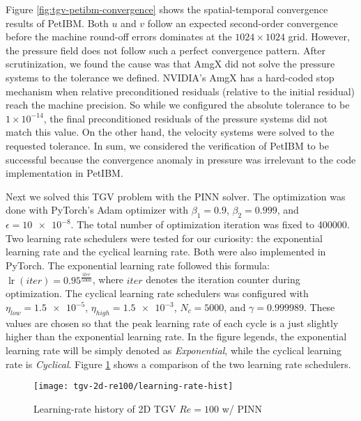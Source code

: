 Figure \ref{fig:tgv-petibm-convergence} shows the spatial-temporal convergence results of PetIBM.
Both $u$ and $v$ follow an expected second-order convergence before the machine round-off errors dominates at the $1024 \times 1024$ grid.
However, the pressure field does not follow such a perfect convergence pattern.
After scrutinization, we found the cause was that AmgX did not solve the pressure systems to the tolerance we defined.
NVIDIA's AmgX has a hard-coded stop mechanism when relative preconditioned residuals (relative to the initial residual) reach the machine precision.
So while we configured the absolute tolerance to be $1\times 10^{-14}$, the final preconditioned residuals of the pressure systems did not match this value.
On the other hand, the velocity systems were solved to the requested tolerance.
In sum, we considered the verification of PetIBM to be successful because the convergence anomaly in pressure was irrelevant to the code implementation in PetIBM.

Next we solved this TGV problem with the PINN solver.
The optimization was done with PyTorch's Adam optimizer with $\beta_1=\num{0.9}$, $\beta_2=\num{0.999}$, and $\epsilon=\num{10e-8}$.
The total number of optimization iteration was fixed to \num{400000}.
Two learning rate schedulers were tested for our curiosity: the exponential learning rate and the cyclical learning rate.
Both were also implemented in PyTorch.
The exponential learning rate followed this formula: $\operatorname{lr}(iter) = 0.95^\frac{iter}{5000}$, where $iter$ denotes the iteration counter during optimization.
The cyclical learning rate schedulers was configured with $\eta_{low}=\num{1.5e-5}$, $\eta_{high}=\num{1.5e-3}$, $N_c=\num{5000}$, and $\gamma=\num{0.999989}$.
These values are chosen so that the peak learning rate of each cycle is a just slightly higher than the exponential learning rate.
In the figure legends, the exponential learning rate will be simply denoted as {\it Exponential}, while the cyclical learning rate is {\it Cyclical}.
Figure \ref{fig:tgv-learning-rate-hist} shows a comparison of the two learning rate schedulers.

\begin{figure}
    \centering%
    \texttt{[image: tgv-2d-re100/learning-rate-hist]}%
    \caption{%
        Learning-rate history of 2D TGV $Re=\num{100}$ w/ PINN
    }
    \label{fig:tgv-learning-rate-hist}%
\end{figure}


